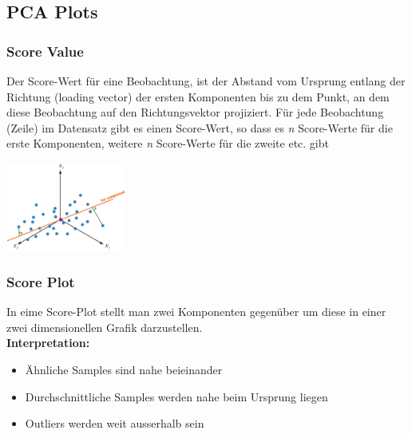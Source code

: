 \documentclass{article}
\newenvironment{Figure}
	{\par\medskip\noindent\minipage{\linewidth}}
	{\endminipage\par\medskip}
\theoremstyle{merke}
\theoremstyle{definition}
\begin{document}
    \subsection{PCA Plots}

		\subsubsection{Score Value}
        Der Score-Wert für eine Beobachtung, ist der Abstand vom Ursprung entlang der Richtung (loading vector) der ersten Komponenten bis zu dem Punkt, an dem diese Beobachtung auf den Richtungsvektor projiziert. Für jede Beobachtung (Zeile) im Datensatz gibt es einen Score-Wert, so dass es \textit{n} Score-Werte für die erste Komponenten, weitere \textit{n} Score-Werte für die zweite etc. gibt
        \begin{Figure}
        \centering
        \includegraphics[width=150px]{img/ScoreValue.png}
            \label{fig:Beispiel eines ScoreValues}
        \end{Figure}

		\subsubsection{Score Plot}
        In eime Score-Plot stellt man zwei Komponenten gegenüber um diese in einer zwei dimensionellen Grafik darzustellen. \\
        \textbf{Interpretation:}
        \begin{itemize}
            \item Ähnliche Samples sind nahe beieinander
            \item Durchschnittliche Samples werden nahe beim Ursprung liegen
            \item Outliers werden weit ausserhalb sein
        \end{itemize}	
\end{document}
